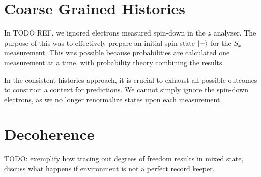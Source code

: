 
\section{Coarse Grained Histories}
In TODO REF, we ignored electrons measured spin-down in the $z$ analyzer. The purpose of this was to effectively prepare an initial spin state $\ket{+}$ for the $S_x$ measurement. This was possible because probabilities are calculated one measurement at a time, with probability theory combining the results.

In the consistent histories approach, it is crucial to exhaust all possible outcomes to construct a context for predictions. We cannot simply ignore the spin-down electrons, as we no longer renormalize states upon each measurement.

\section{Decoherence}
TODO: exemplify how tracing out degrees of freedom results in mixed state, discuss what happens if environment is not a perfect record keeper.



